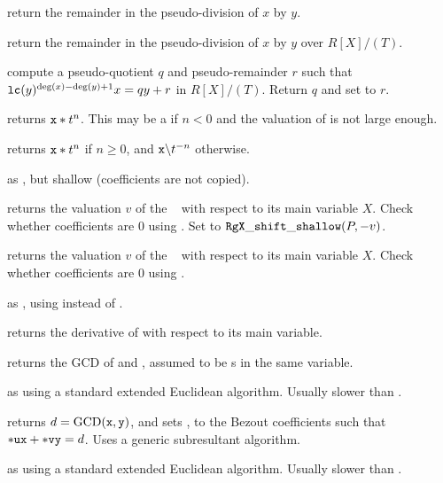  return the remainder
in the pseudo-division of $x$ by $y$.

 return the remainder
in the pseudo-division of $x$ by $y$ over $R[X]/(T)$.

 compute
a pseudo-quotient $q$ and pseudo-remainder $r$ such that
${\tt lc}(y)^{\deg(x) - \deg(y) + 1}x = qy + r$ in $R[X]/(T)$. Return $q$ and
set  to $r$.

 returns ${\tt x} * t^n$. This may
be a  if $n < 0$ and the valuation of  is not large
enough.

 returns ${\tt x} * t^n$ if $n\geq 0$,
and $\kbd{x} \bs t^{-n}$ otherwise.

 as , but
shallow (coefficients are not copied).

 returns the valuation $v$ of the
~ with respect to its main variable $X$. Check whether
coefficients are $0$ using . Set  to
${\tt RgX\_shift\_shallow}(P,-v)$.

 returns the valuation $v$ of the
~ with respect to its main variable $X$. Check whether
coefficients are $0$ using .

 as , using
 instead of .

 returns the derivative of  with respect to
its main variable.

 returns the GCD of  and ,
assumed to be s in the same variable.

 as  using a standard
extended Euclidean algorithm. Usually slower than .

 returns
$d = {\rm GCD}({\tt x},{\tt y})$, and sets ,  to the Bezout
coefficients such that ${\tt *ux} + {\tt *vy} = d$. Uses a generic
subresultant algorithm.

 as
 using a standard extended Euclidean algorithm. Usually
slower than .

